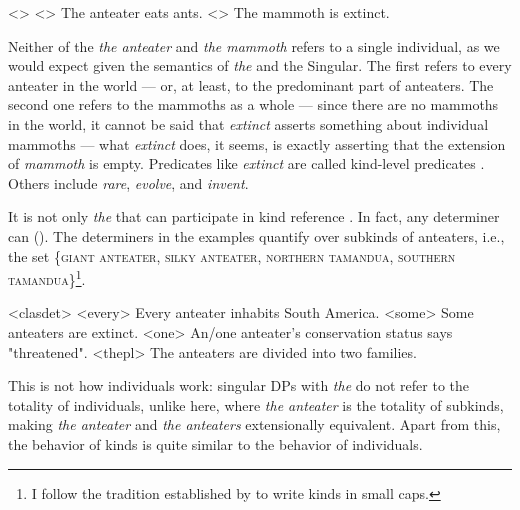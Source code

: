 \documentclass[a4paper, 12pt]{article}
\begin{document}
\pex<>
\a<> The anteater eats ants.
\a<> The mammoth is extinct.
\xe

Neither of the \textit{the anteater} and \textit{the mammoth} refers to a single individual, as we would expect given the semantics of \textit{the} and the Singular. The first refers to every anteater in the world --- or, at least, to the predominant part of anteaters. The second one refers to the mammoths as a whole --- since there are no mammoths in the world, it cannot be said that \textit{extinct} asserts something about individual mammoths --- what \textit{extinct} does, it seems, is exactly asserting that the extension of \textit{mammoth} is empty. Predicates like \textit{extinct} are called kind-level predicates \parencite{krifka1995genericityintroduction}. Others include \textit{rare}, \textit{evolve}, and \textit{invent}.

It is not only \textit{the} that can participate in kind reference \parencite{dayal2004numbermarkingdefiniteness}. In fact, any determiner can (\nextx). The determiners in the examples quantify over subkinds of anteaters, i.e., the set \{\textsc{giant anteater, silky anteater, northern tamandua, southern tamandua}\}\footnote{I follow the tradition established by \textcite{chierchia1998referencekindslanguages} to write kinds in small caps.}. 

\pex<clasdet>
\a<every> Every anteater inhabits South America.
\a<some> Some anteaters are extinct.
\a<one> An/one anteater's conservation status says "threatened".
\a<thepl> The anteaters are divided into two families.
\xe

This is not how individuals work: singular DPs with \textit{the} do not refer to the totality of individuals, unlike here, where \textit{the anteater} is the totality of subkinds, making \textit{the anteater} and \textit{the anteaters} extensionally equivalent. Apart from this, the behavior of kinds is quite similar to the behavior of individuals.\footnotemark{}

\end{document}
